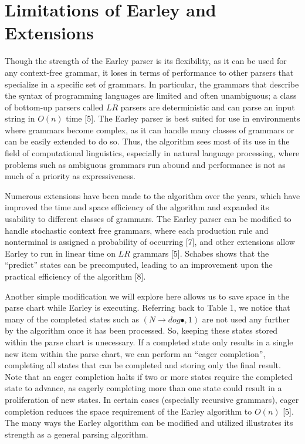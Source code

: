 \documentclass[a4paper, 11pt]{article}
\begin{document}
\section{Limitations of Earley and Extensions}
Though the strength of the Earley parser is its flexibility, as it can be used for any context-free grammar, it loses in terms of performance to other parsers that specialize
in a specific set of grammars. In particular, the grammars that describe the syntax of programming languages are limited and often unambiguous; a class of bottom-up parsers
called $LR$ parsers are deterministic and can parse an input string in $O(n)$ time [5]. The Earley parser is best suited for use in environments where grammars become complex,
as it can handle many classes of grammars or can be easily extended to do so. Thus, the algorithm sees most of its use in the field of computational linguistics, especially
in natural language processing, where problems such as ambiguous grammars run abound and performance is not as much of a priority as expressiveness. 

Numerous extensions have been made to the algorithm over the years, which have improved the time and space efficiency of the algorithm and expanded its usability to different
classes of grammars. The Earley parser can be modified to handle stochastic context free grammars, where each 
production rule and nonterminal is assigned a probability of occurring [7], and other extensions allow Earley to run in linear time on $LR$ grammars [5]. 
Schabes shows that the ``predict'' states can be precomputed, leading to an improvement upon the practical efficiency of the algorithm [8]. 

Another simple modification we will explore here allows us to save space in the parse chart while Earley is executing. Referring back to Table 1, we notice that many of the
completed states such as $(N \to dog \bullet, 1)$ are not used any further by the algorithm once it has been processed. So, keeping these states stored within the parse chart
is unecessary. If a completed state only results in a single new item within the parse chart, we can perform an ``eager completion'', completing all states that can be
completed and storing only the final result. Note that an eager completion halts if two or more states require the completed state to advance, as eagerly completing more than
one state could result in a proliferation of new states. In certain cases (especially recursive grammars), eager completion reduces the space requirement of the Earley 
algorithm to $O(n)$ [5]. The many ways the Earley algorithm can be modified and utilized illustrates its strength as a general parsing algorithm.
\end{document}
